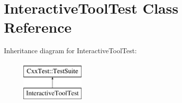 \hypertarget{classInteractiveToolTest}{\section{Interactive\-Tool\-Test Class Reference}
\label{classInteractiveToolTest}
}
Inheritance diagram for Interactive\-Tool\-Test\-:\begin{figure}[H]
\begin{center}
\leavevmode
\includegraphics[height=2.000000cm]{classInteractiveToolTest}
\end{center}
\end{figure}
